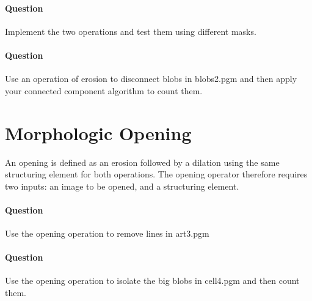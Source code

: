 \documentclass[a4paper, 11pt]{article}
\begin{document}
\paragraph{Question} Implement the two operations and test them using different masks.

\paragraph{Question} Use an operation of erosion to disconnect blobs in blobs2.pgm and then apply your connected component algorithm to count them.

\section*{\bf Morphologic Opening}

An opening is defined as an erosion followed by a dilation using the same structuring element for both operations.
The opening operator therefore requires two inputs: an image to be opened, and a structuring element.

\paragraph{Question} Use the opening operation to remove lines in art3.pgm

\paragraph{Question} Use the opening operation to isolate the big blobs in cell4.pgm and then count them.
\end{document}
